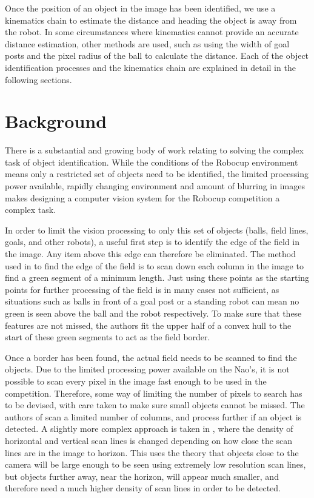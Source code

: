 \documentclass[pdftex,11pt,a4paper]{report}
\begin{document}
Once the position of an object in the image has been identified, we use a
kinematics chain to estimate the distance and heading the object is away
from the robot. In some circumstances where kinematics cannot provide an accurate distance estimation, other methods are used, such as using the width of goal posts and the pixel radius of the ball to calculate the distance. Each of the object identification processes and the kinematics chain are explained in detail in the following sections.

\section{Background} 

There is a substantial and growing body of work relating to solving the complex task of object identification. While the conditions of the Robocup environment means only a restricted set of objects need to be identified, the limited processing power available, rapidly changing environment and amount of blurring in images makes designing a computer vision system for the Robocup competition a complex task.

In order to limit the vision processing to only this set of objects (balls, field lines, goals, and other robots), a useful first step is to identify the edge of the field in the image. Any item above this edge can therefore be eliminated. The method used in \cite{thomas09code} to find the edge of the field is to scan down each column in the image to find a green segment of a minimum length. Just using these points as the starting points for further processing of the field is in many cases not sufficient, as situations such as balls in front of a goal post or a standing robot can mean no green is seen above the ball and the robot respectively. To make sure that these features are not missed, the authors fit the upper half of a convex hull to the start of these green segments to act as the field border.

Once a border has been found, the actual field needs to be scanned to find
the objects. Due to the limited processing power available on the Nao's, it
is not possible to scan every pixel in the image fast enough to be used in
the competition. Therefore, some way of limiting the number of pixels to search has to be devised, with care taken to make sure small objects cannot be missed. The authors of \cite{thomas09code} scan a limited number of columns, and process further if an object is detected. A slightly more complex approach is taken in \cite{north2005object}, where the density of horizontal and vertical scan lines is changed depending on how close the scan lines are in the image to horizon. This uses the theory that objects close to the camera will be large enough to be seen using extremely low resolution scan lines, but objects further away, near the horizon, will appear much smaller, and therefore need a much higher density of scan lines in order to be detected.  
\end{document}
